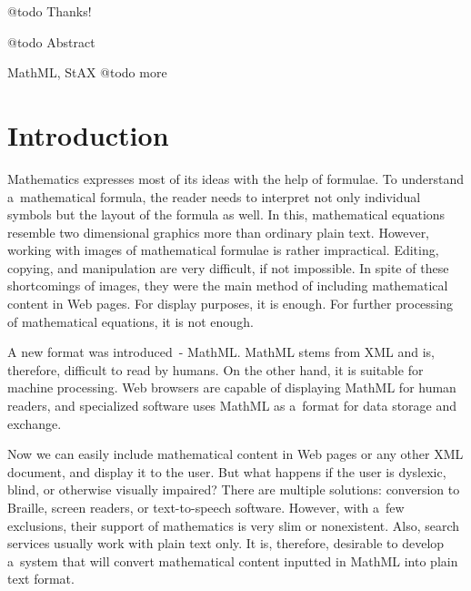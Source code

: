 \documentclass[11pt,oneside,final]{fithesis2}
\begin{document}
\sloppy




\FrontMatter
\ThesisTitlePage

\begin{ThesisDeclaration}
\DeclarationText
\AdvisorName
\end{ThesisDeclaration}

\begin{ThesisThanks}
@todo Thanks!
\end{ThesisThanks}

\begin{ThesisAbstract}
@todo Abstract
\end{ThesisAbstract}

\begin{ThesisKeyWords}
MathML, StAX  @todo more
\end{ThesisKeyWords}

\MainMatter
\tableofcontents

\chapter{Introduction}
Mathematics expresses most of its ideas with the help of formulae. To understand a~mathematical formula, the reader needs to interpret not only individual symbols but the layout of the formula as well. In this, mathematical equations resemble two dimensional graphics more than ordinary plain text. However, working with images of mathematical formulae is rather impractical. Editing, copying, and manipulation are very difficult, if not impossible. In spite of these shortcomings of images, they were the main method of including mathematical content in Web pages. For display purposes, it is enough. For further processing of mathematical equations, it is not enough. 

A new format was introduced~- MathML. MathML stems from XML and is, therefore, difficult to read by humans. On the other hand, it is suitable for machine processing. Web browsers are capable of displaying MathML for human readers, and specialized software uses MathML as a~format for data storage and exchange. 

Now we can easily include mathematical content in Web pages or any other XML document, and display it to the user. But what happens if the user is dyslexic, blind, or otherwise visually impaired? There are multiple solutions: conversion to Braille, screen readers, or text-to-speech software. However, with a~few exclusions, their support of mathematics is very slim or nonexistent. Also, search services usually work with plain text only. It is, therefore, desirable to develop a~system that will convert mathematical content inputted in MathML into plain text format. 
\end{document}
